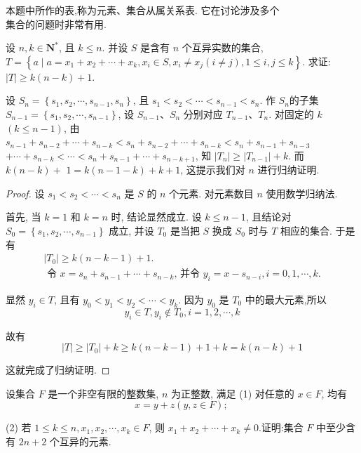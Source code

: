 \begin{note}
	本题中所作的表,称为元素、集合从属关系表. 它在讨论涉及多个\\
	集合的问题时非常有用.
\end{note}

\begin{example}
	设 $n, k \in \mathbf{N}^{*}$, 且 $k \leqslant n$. 并设 $S$ 是含有 $n$ 个互异实数的集合, $T=\left\{a \mid a=x_{1}+x_{2}+\cdots+x_{k}, x_{i} \in S, x_{i} \neq x_{j}(i \neq j), 1 \leqslant i, j \leqslant k\right\}$. 求证: $|T| \geqslant k(n-k)+1$.
\end{example}

\begin{analysis}
	设 $S_{n}=\left\{s_{1}, s_{2}, \cdots, s_{n-1}, s_{n}\right\}$, 且 $s_{1}<s_{2}<\cdots<s_{n-1}<s_{n}$. 作 $S_{n}$的子集 $S_{n-1}=\left\{s_{1}, s_{2}, \cdots, s_{n-1}\right\}$, 设 $S_{n-1} 、 S_{n}$ 分别对应 $T_{n-1} 、 T_{n}$. 对固定的 $k$ $(k \leqslant n-1)$, 由 $s_{n-1}+s_{n-2}+\cdots+s_{n-k}<s_{n}+s_{n-2}+\cdots+s_{n-k}<s_{n}+s_{n-1}+s_{n-3}$ $+\cdots+s_{n-k}<\cdots<s_{n}+s_{n-1}+\cdots+s_{n-k+1}$, 知 $\left|T_{n}\right| \geqslant\left|T_{n-1}\right|+k$. 而 $k(n-k)+$ $1=k(n-1-k)+k+1$, 这提示我们对 $n$ 进行归纳证明.
\end{analysis}

\begin{proof}
	设 $s_{1}<s_{2}<\cdots<s_{n}$ 是 $S$ 的 $n$ 个元素. 对元素数目 $n$ 使用数学归纳法.

	首先, 当 $k=1$ 和 $k=n$ 时, 结论显然成立. 设 $k \leqslant n-1$, 且结论对 $S_{0}=\left\{s_{1}, s_{2}, \cdots, s_{n-1}\right\}$ 成立, 并设 $T_{0}$ 是当把 $S$ 换成 $S_{0}$ 时与 $T$ 相应的集合. 于是有
	$$
		\begin{gathered}
			\left|T_{0}\right| \geqslant k(n-k-1)+1 . \\
			\text { 令 } x=s_{n}+s_{n-1}+\cdots+s_{n-k} \text {, 并令 } y_{i}=x-s_{n-i}, i=0,1, \cdots, k .
		\end{gathered}
	$$

	显然 $y_{i} \in T$, 且有 $y_{0}<y_{1}<y_{2}<\cdots<y_{k}$. 因为 $y_{0}$ 是 $T_{0}$ 中的最大元素,所以
	$$
		y_{i} \in T, y_{i} \notin T_{0}, i=1,2, \cdots, k
	$$

	故有
	$$
		|T| \geqslant\left|T_{0}\right|+k \geqslant k(n-k-1)+1+k=k(n-k)+1
	$$

	这就完成了归纳证明.
\end{proof}

\begin{example}
	设集合 $F$ 是一个非空有限的整数集, $n$ 为正整数, 满足 (1) 对任意的 $x \in F$, 均有
	$$
		x=y+z(y, z \in F) \text {; }
	$$

	(2) 若 $1 \leqslant k \leqslant n, x_{1}, x_{2}, \cdots, x_{k} \in F$, 则 $x_{1}+x_{2}+\cdots+x_{k} \neq 0$.证明:集合 $F$ 中至少含有 $2 n+2$ 个互异的元素.
\end{example}

